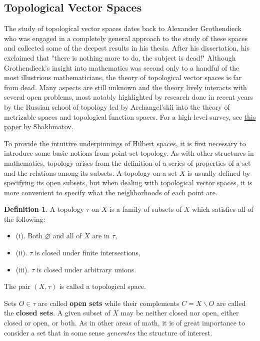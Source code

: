 \documentclass[psamsfonts]{amsart}
\theoremstyle{definition}
\newtheorem{defn}[thm]{Definition}
\theoremstyle{remark}
\numberwithin{equation}{section}
\begin{document}
\subsection{Topological Vector Spaces} 
The study of topological vector spaces dates back to Alexander Grothendieck who was engaged in a completely general approach to the study of these spaces and collected some of the deepest results in his thesis. After his dissertation, his exclaimed that "there is nothing more to do, the subject is dead!" Although Grothendieck's insight into mathematics was second only to a handful of the most illustrious mathematicians, the theory of topological vector spaces is far from dead. Many aspects are still unknown and the theory lively interacts with several open problems, most notably highlighted by research done in recent years by the Russian school of topology led by Archangel'skii into the theory of metrizable spaces and topological function spaces. For a high-level survey, see \href{https://doi.org/10.1016/S0166-8641(97)00242-3}{this paper} by Shakhmatov. 

 To provide the intuitive underpinnings of Hilbert spaces, it is first necessary to introduce some basic notions from point-set topology. As with other structures in mathematics, topology arises from the definition of a series of properties of a set and the relations among its subsets. A topology on a set $X$ is usually defined by specifying its open subsets, but when dealing with topological vector spaces, it is more convenient to specify what the neighborhoods of each point are.

\begin{defn}
A topology $\tau$ on $X$ is a family of subsets of $X$ which satisfies all of the following: 
\begin{itemize}
    \item (i). Both $\varnothing$ and all of $X$ are in $\tau,$
    \item (ii). $\tau$ is closed under finite intersections, 
    \item (iii). $\tau$ is closed under arbitrary unions. 
\end{itemize}
The pair $(X, \tau)$ is called a topological space. 
\end{defn}

Sets $O \in \tau$ are called \textbf{open sets} while their complements $C = X \backslash O$ are called the \textbf{closed sets}. A given subset of $X$ may be neither closed nor open, either closed or open, or both. As in other areas of math, it is of great importance to consider a set that in some sense \textit{generates} the structure of interest. 
\end{document}
